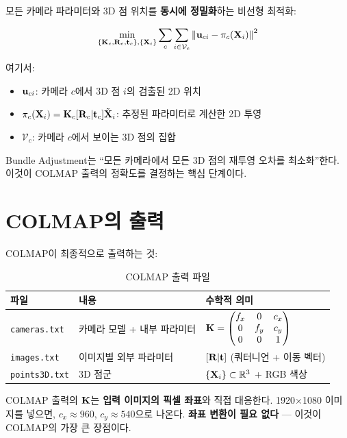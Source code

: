 \documentclass[11pt, a4paper]{report}
\theoremstyle{definition}
\theoremstyle{remark}
\begin{document}
모든 카메라 파라미터와 3D 점 위치를 \textbf{동시에 정밀화}하는 비선형 최적화:

\begin{equation}
\min_{\{\mathbf{K}_c, \mathbf{R}_c, \mathbf{t}_c\}, \{\mathbf{X}_i\}}
\sum_{c} \sum_{i \in \mathcal{V}_c} \left\| \mathbf{u}_{ci} - \pi_c(\mathbf{X}_i) \right\|^2
\label{eq:ba}
\end{equation}

여기서:
\begin{itemize}[nosep]
  \item $\mathbf{u}_{ci}$: 카메라 $c$에서 3D 점 $i$의 검출된 2D 위치
  \item $\pi_c(\mathbf{X}_i) = \mathbf{K}_c [\mathbf{R}_c | \mathbf{t}_c] \tilde{\mathbf{X}}_i$: 추정된 파라미터로 계산한 2D 투영
  \item $\mathcal{V}_c$: 카메라 $c$에서 보이는 3D 점의 집합
\end{itemize}

\begin{keyidea}
Bundle Adjustment는 ``모든 카메라에서 모든 3D 점의 재투영 오차를 최소화''한다.
이것이 COLMAP 출력의 정확도를 결정하는 핵심 단계이다.
\end{keyidea}


\section{COLMAP의 출력}

COLMAP이 최종적으로 출력하는 것:

\begin{table}[H]
\centering
\caption{COLMAP 출력 파일}
\renewcommand{\arraystretch}{1.3}
\begin{tabularx}{\textwidth}{llX}
\toprule
\textbf{파일} & \textbf{내용} & \textbf{수학적 의미} \\
\midrule
\texttt{cameras.txt} & 카메라 모델 + 내부 파라미터 & $\mathbf{K} = \begin{pmatrix} f_x & 0 & c_x \\ 0 & f_y & c_y \\ 0 & 0 & 1 \end{pmatrix}$ \\
\texttt{images.txt} & 이미지별 외부 파라미터 & $[\mathbf{R} | \mathbf{t}]$ (쿼터니언 + 이동 벡터) \\
\texttt{points3D.txt} & 3D 점군 & $\{\mathbf{X}_i\} \subset \mathbb{R}^3$ + RGB 색상 \\
\bottomrule
\end{tabularx}
\end{table}

\begin{keyidea}
COLMAP 출력의 $\mathbf{K}$는 \textbf{입력 이미지의 픽셀 좌표}와 직접 대응한다.
1920$\times$1080 이미지를 넣으면, $c_x \approx 960$, $c_y \approx 540$으로 나온다.
\textbf{좌표 변환이 필요 없다} --- 이것이 COLMAP의 가장 큰 장점이다.
\end{keyidea}
\end{document}
